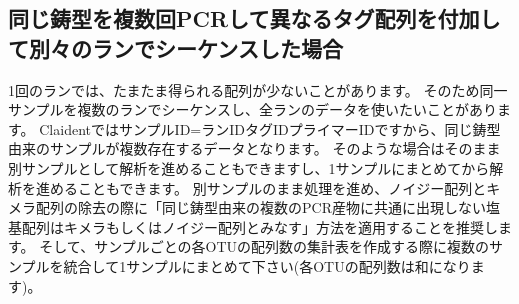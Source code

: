 \documentclass[titlepage,10pt,a4paper]{jsbook}
\begin{document}
\subsection{同じ鋳型を複数回PCRして異なるタグ配列を付加して別々のランでシーケンスした場合}

1回のランでは、たまたま得られる配列が少ないことがあります。
そのため同一サンプルを複数のランでシーケンスし、全ランのデータを使いたいことがあります。
ClaidentではサンプルID=ランID{\textunderscore}{\textunderscore}タグID{\textunderscore}{\textunderscore}プライマーIDですから、同じ鋳型由来のサンプルが複数存在するデータとなります。
そのような場合はそのまま別サンプルとして解析を進めることもできますし、1サンプルにまとめてから解析を進めることもできます。
別サンプルのまま処理を進め、ノイジー配列とキメラ配列の除去の際に「同じ鋳型由来の複数のPCR産物に共通に出現しない塩基配列はキメラもしくはノイジー配列とみなす」方法を適用することを推奨します。
そして、サンプルごとの各OTUの配列数の集計表を作成する際に複数のサンプルを統合して1サンプルにまとめて下さい(各OTUの配列数は和になります)。
\end{document}

